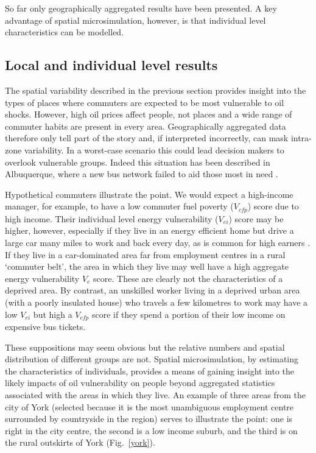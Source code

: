 \documentclass[a4paper, 11pt, twoside]{Thesis}
\begin{document}
So far only geographically aggregated results have been presented.
A key advantage of spatial microsimulation, however, is that individual level
characteristics can be modelled.

\subsection{Local and individual level results}
\label{s:indresults}
The spatial variability described in the previous section
provides insight into the types of places
where commuters are expected to be most vulnerable to oil shocks.
However, high oil prices affect people, not places and a wide range of
commuter habits are present in every area. Geographically
aggregated data therefore only tell part of the story and, if
interpreted incorrectly, can mask intra-zone variability.
In a worst-case scenario this could lead decision makers to
overlook vulnerable groups. Indeed this situation has been described
in Albuquerque, where a new bus network failed to
aid those most in need \citep{Tribby2012}.

Hypothetical commuters illustrate the point. We would expect a
high-income manager, for example, to have a low commuter fuel poverty
($V_{cfp}$)
score due to high income. Their individual level energy vulnerability ($V_{ei}$)
score may be higher, however,
especially if they live in an energy efficient home but drive a large car
many miles to work and back every day, as is common for high earners
\citep{Green-1999-ld-commute}. If they live in a car-dominated area far from
employment centres in a rural `commuter belt', the area in which they live
may well have a high aggregate energy vulnerability $V_e$ score. These
are clearly not the characteristics of a deprived area.
By contrast, an unskilled worker living in a deprived urban area (with a poorly
insulated house) who travels a few kilometres to work may have a low
$V_{ei}$ but high a $V_{cfp}$ score if they spend
a portion of their low income on expensive bus tickets.

These suppositions may seem obvious but the relative numbers and spatial
distribution of different groups are not. Spatial microsimulation, by estimating
the characteristics of individuals, provides a means of gaining insight into
the likely impacts of oil vulnerability on people beyond aggregated statistics
associated with the areas in which they live. An example of three areas from the
city of York (selected because it is the most unambiguous employment centre
surrounded by countryside in the region) serves to illustrate the point: one is
right in the city centre,
the second is a low income suburb, and the third is on the rural outskirts of
York
(Fig.~\ref{york}).
\end{document}
